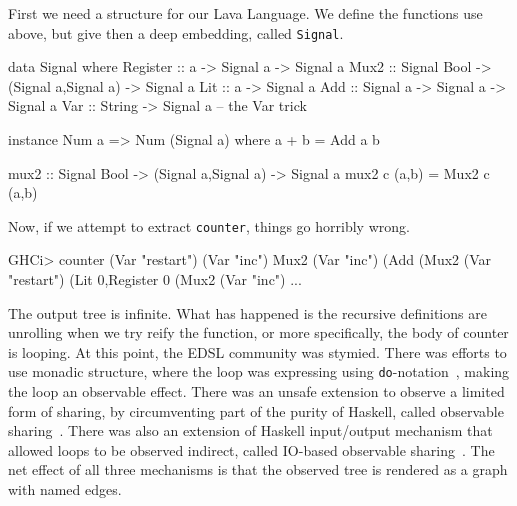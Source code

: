 \documentclass[11pt]{article}
\begin{document}
First we need a structure for our Lava Language. We define the
functions use above, but give then a deep embedding, called \verb|Signal|.
\begin{Code}
        
data Signal where
  Register :: a -> Signal a                      -> Signal a
  Mux2     :: Signal Bool -> (Signal a,Signal a) -> Signal a
  Lit      :: a                                  -> Signal a
  Add      :: Signal a -> Signal a               -> Signal a
  Var      :: String                             -> Signal a -- the Var trick

instance Num a => Num (Signal a) where
  a + b = Add a b

mux2 :: Signal Bool -> (Signal a,Signal a) -> Signal a
mux2 c (a,b) = Mux2 c (a,b)

\end{Code}
Now, if we attempt to extract \verb|counter|, things go horribly wrong.
\begin{Code}
GHCi> counter (Var "restart") (Var "inc")
Mux2 (Var "inc") (Add (Mux2 (Var "restart") (Lit 0,Register 0 (Mux2 (Var "inc") ...
\end{Code}        
The output tree is infinite.
What has happened is the recursive definitions are unrolling when we try reify the function,
or more specifically, the body of counter is looping. At this point, the EDSL community was
stymied. There was efforts to use monadic structure, where the loop was expressing using
\verb|do|-notation~\cite{Erkok:2000:Recursive-Monad},
making the loop an observable effect. There was an unsafe
extension to observe a limited form of sharing, by circumventing part of the purity of Haskell,
called observable sharing~\cite{Claessen:99:ObserveSharing}.
There was also an extension of Haskell input/output mechanism that allowed loops to
be observed indirect, called IO-based observable sharing~\cite{Gill:09:TypeSafeReification}. 
The net effect of all three
mechanisms is that the observed tree is rendered as a graph with named edges.
\end{document}
